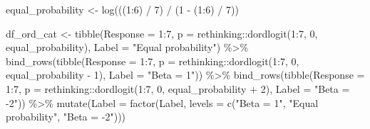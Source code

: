 \documentclass[
]{book}
\newenvironment{Shaded}{\begin{snugshade}}{\end{snugshade}}
\newcommand{\AttributeTok}[1]{\textcolor[rgb]{0.77,0.63,0.00}{#1}}
\newcommand{\DecValTok}[1]{\textcolor[rgb]{0.00,0.00,0.81}{#1}}
\newcommand{\FunctionTok}[1]{\textcolor[rgb]{0.00,0.00,0.00}{#1}}
\newcommand{\NormalTok}[1]{#1}
\newcommand{\OtherTok}[1]{\textcolor[rgb]{0.56,0.35,0.01}{#1}}
\newcommand{\SpecialCharTok}[1]{\textcolor[rgb]{0.00,0.00,0.00}{#1}}
\newcommand{\StringTok}[1]{\textcolor[rgb]{0.31,0.60,0.02}{#1}}
\begin{document}
\begin{Shaded}
\begin{Highlighting}[]
\NormalTok{equal\_probability }\OtherTok{\textless{}{-}} \FunctionTok{log}\NormalTok{(((}\DecValTok{1}\SpecialCharTok{:}\DecValTok{6}\NormalTok{) }\SpecialCharTok{/} \DecValTok{7}\NormalTok{) }\SpecialCharTok{/}\NormalTok{  (}\DecValTok{1} \SpecialCharTok{{-}}\NormalTok{ (}\DecValTok{1}\SpecialCharTok{:}\DecValTok{6}\NormalTok{) }\SpecialCharTok{/} \DecValTok{7}\NormalTok{))}
  
\NormalTok{df\_ord\_cat }\OtherTok{\textless{}{-}} 
  \FunctionTok{tibble}\NormalTok{(}\AttributeTok{Response =} \DecValTok{1}\SpecialCharTok{:}\DecValTok{7}\NormalTok{, }
         \AttributeTok{p =}\NormalTok{ rethinking}\SpecialCharTok{::}\FunctionTok{dordlogit}\NormalTok{(}\DecValTok{1}\SpecialCharTok{:}\DecValTok{7}\NormalTok{, }\DecValTok{0}\NormalTok{, equal\_probability),}
         \AttributeTok{Label =} \StringTok{"Equal probability"}\NormalTok{) }\SpecialCharTok{\%\textgreater{}\%}
  \FunctionTok{bind\_rows}\NormalTok{(}\FunctionTok{tibble}\NormalTok{(}\AttributeTok{Response =} \DecValTok{1}\SpecialCharTok{:}\DecValTok{7}\NormalTok{, }
         \AttributeTok{p =}\NormalTok{ rethinking}\SpecialCharTok{::}\FunctionTok{dordlogit}\NormalTok{(}\DecValTok{1}\SpecialCharTok{:}\DecValTok{7}\NormalTok{, }\DecValTok{0}\NormalTok{, equal\_probability }\SpecialCharTok{{-}} \DecValTok{1}\NormalTok{),}
         \AttributeTok{Label =} \StringTok{"Beta = 1"}\NormalTok{)) }\SpecialCharTok{\%\textgreater{}\%}
  \FunctionTok{bind\_rows}\NormalTok{(}\FunctionTok{tibble}\NormalTok{(}\AttributeTok{Response =} \DecValTok{1}\SpecialCharTok{:}\DecValTok{7}\NormalTok{, }
         \AttributeTok{p =}\NormalTok{ rethinking}\SpecialCharTok{::}\FunctionTok{dordlogit}\NormalTok{(}\DecValTok{1}\SpecialCharTok{:}\DecValTok{7}\NormalTok{, }\DecValTok{0}\NormalTok{, equal\_probability }\SpecialCharTok{+} \DecValTok{2}\NormalTok{),}
         \AttributeTok{Label =} \StringTok{"Beta = {-}2"}\NormalTok{)) }\SpecialCharTok{\%\textgreater{}\%}
  \FunctionTok{mutate}\NormalTok{(}\AttributeTok{Label =} \FunctionTok{factor}\NormalTok{(Label, }\AttributeTok{levels =} \FunctionTok{c}\NormalTok{(}\StringTok{"Beta = 1"}\NormalTok{, }\StringTok{"Equal probability"}\NormalTok{, }\StringTok{"Beta = {-}2"}\NormalTok{)))}


\end{Highlighting}
\end{Shaded}
\end{document}
